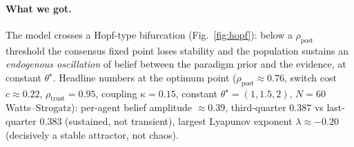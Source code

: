 \documentclass[11pt,a4paper]{article}
\theoremstyle{plain}
\begin{document}
\paragraph{What we got.} The model crosses a Hopf-type bifurcation
(Fig.~\ref{fig:hopf}): below a $\rho_{\text{post}}$ threshold the
consensus fixed point loses stability and the population sustains an
\emph{endogenous oscillation} of belief between the paradigm prior and
the evidence, at constant $\theta^\star$. Headline numbers at the
optimum point ($\rho_{\text{post}}\approx 0.76$, switch cost $c\approx
0.22$, $\rho_{\text{trust}}=0.95$, coupling $\kappa=0.15$, constant
$\theta^\star=(1,1.5,2)$, $N=60$ Watts--Strogatz):
per-agent belief amplitude $\approx 0.39$, third-quarter $0.387$ vs
last-quarter $0.383$ (sustained, not transient), largest Lyapunov
exponent $\lambda\approx -0.20$ (decisively a stable attractor, not
chaos).
\end{document}
